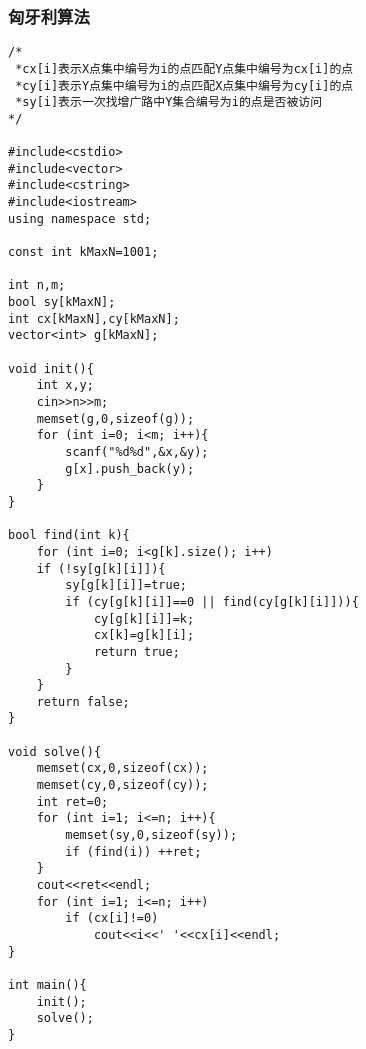 \subsubsection{匈牙利算法}

\begin{verbatim}
/*
 *cx[i]表示X点集中编号为i的点匹配Y点集中编号为cx[i]的点
 *cy[i]表示Y点集中编号为i的点匹配X点集中编号为cy[i]的点
 *sy[i]表示一次找增广路中Y集合编号为i的点是否被访问
*/

#include<cstdio>
#include<vector>
#include<cstring>
#include<iostream>
using namespace std;

const int kMaxN=1001;

int n,m;
bool sy[kMaxN];
int cx[kMaxN],cy[kMaxN];
vector<int> g[kMaxN];

void init(){
    int x,y;
    cin>>n>>m;
    memset(g,0,sizeof(g));
    for (int i=0; i<m; i++){
        scanf("%d%d",&x,&y);
        g[x].push_back(y);
    }
}

bool find(int k){
    for (int i=0; i<g[k].size(); i++)
    if (!sy[g[k][i]]){
        sy[g[k][i]]=true;
        if (cy[g[k][i]]==0 || find(cy[g[k][i]])){
            cy[g[k][i]]=k;
            cx[k]=g[k][i];
            return true;
        }
    }
    return false;
}

void solve(){
    memset(cx,0,sizeof(cx));
    memset(cy,0,sizeof(cy));
    int ret=0;
    for (int i=1; i<=n; i++){
        memset(sy,0,sizeof(sy));
        if (find(i)) ++ret;
    }
    cout<<ret<<endl;
    for (int i=1; i<=n; i++)
        if (cx[i]!=0)
            cout<<i<<' '<<cx[i]<<endl;
}

int main(){
    init();
    solve();
}
\end{verbatim}
